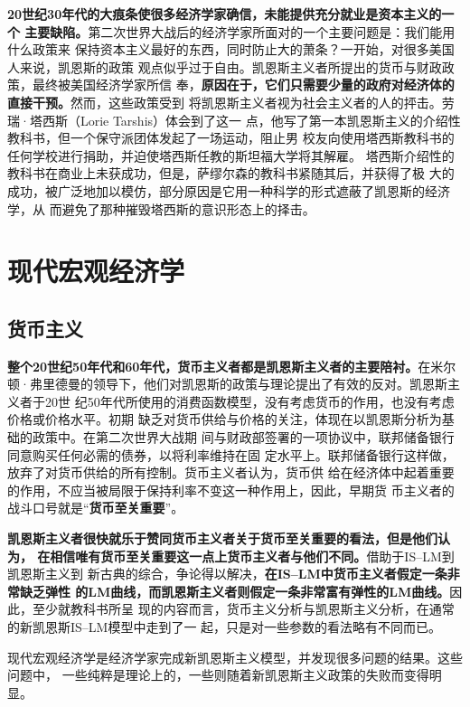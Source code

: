 \textbf{20世纪30年代的大痕条使很多经济学家确信，未能提供充分就业是资本主义的一个
  主要缺陷。}第二次世界大战后的经济学家所面对的一个主要问题是：我们能用什么政策来
保持资本主义最好的东西，同时防止大的萧条？一开始，对很多美国人来说，凯恩斯的政策
观点似乎过于自由。凯恩斯主义者所提出的货币与财政政策，最终被美国经济学家所信
奉，\textbf{原因在于，它们只需要少量的政府对经济体的直接干预。}然而，这些政策受到
将凯恩斯主义者视为社会主义者的人的抨击。劳瑞·塔西斯（Lorie Tarshis）体会到了这一
点，他写了第一本凯恩斯主义的介绍性教科书，但一个保守派团体发起了一场运动，阻止男
校友向使用塔西斯教科书的任何学校进行捐助，并迫使塔西斯任教的斯坦福大学将其解雇。
塔西斯介绍性的教科书在商业上未获成功，但是，萨缪尔森的教科书紧随其后，并获得了极
大的成功，被广泛地加以模仿，部分原因是它用一种科学的形式遮蔽了凯恩斯的经济学，从
而避免了那种摧毁塔西斯的意识形态上的择击。

\section{现代宏观经济学}

\subsection{货币主义}

\textbf{整个20世纪50年代和60年代，货币主义者都是凯恩斯主义者的主要陪衬。}在米尔
顿·弗里德曼的领导下，他们对凯恩斯的政策与理论提出了有效的反对。凯恩斯主义者于20世
纪50年代所使用的消费函数模型，没有考虑货币的作用，也没有考虑价格或价格水平。初期
缺乏对货币供给与价格的关注，体现在以凯恩斯分析为基础的政策中。在第二次世界大战期
间与财政部签署的一项协议中，联邦储备银行同意购买任何必需的债券，以将利率维持在固
定水平上。联邦储备银行这样做，放弃了对货币供给的所有控制。货币主义者认为，货币供
给在经济体中起着重要的作用，不应当被局限于保持利率不变这一种作用上，因此，早期货
币主义者的战斗口号就是“\textbf{货币至关重要}”。

\textbf{凯恩斯主义者很快就乐于赞同货币主义者关于货币至关重要的看法，但是他们认为，
  在相信唯有货币至关重要这一点上货币主义者与他们不同。}借助于IS--LM到凯恩斯主义到
新古典的综合，争论得以解决，\textbf{在IS--LM中货币主义者假定一条非常缺乏弹性
  的LM曲线，而凯恩斯主义者则假定一条非常富有弹性的LM曲线。}因此，至少就教科书所呈
现的内容而言，货币主义分析与凯恩斯主义分析，在通常的新凯恩斯IS--LM模型中走到了一
起，只是对一些参数的看法略有不同而已。

现代宏观经济学是经济学家完成新凯恩斯主义模型，并发现很多问题的结果。这些问题中，
一些纯粹是理论上的，一些则随着新凯恩斯主义政策的失败而变得明显。

